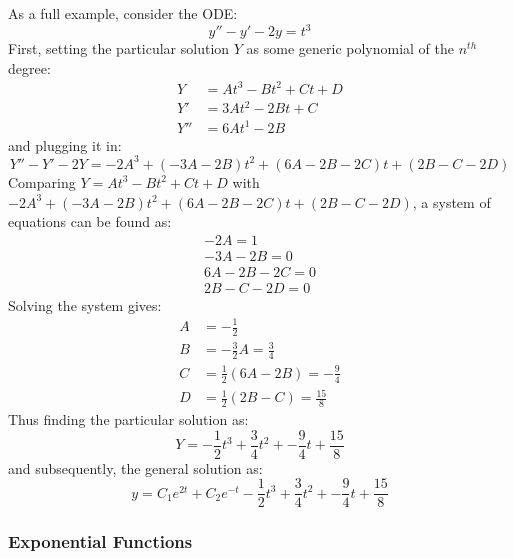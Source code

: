 \documentclass[12pt]{article}
\begin{document}
As a full example, consider the ODE:
\begin{equation*}
  y'' - y' - 2y = t^3
\end{equation*}
First, setting the particular solution $Y$ as some generic polynomial of the $n^{th}$ degree:
\begin{align*}
  Y &= At^3 - Bt^2 + Ct + D \\
  Y' &= 3At^2 - 2Bt + C \\
  Y'' &= 6At^1 - 2B
\end{align*}
and plugging it in:
\begin{equation*}
  Y'' - Y' - 2Y = -2A^3 + \left(-3A-2B\right)t^2 + (6A-2B-2C)t + (2B-C-2D)
\end{equation*}
Comparing $Y = At^3 - Bt^2 + Ct + D$ with $-2A^3 + \left(-3A-2B\right)t^2 + (6A-2B-2C)t + (2B-C-2D)$, a system of equations can be found as:
\begin{gather*}
  -2A = 1 \\
  -3A-2B = 0 \\
  6A - 2B - 2C = 0 \\
  2B - C - 2D = 0
\end{gather*}
Solving the system gives:
\begin{align*}
  A &= - \frac{1}{2} \\
  B &= - \frac{3}{2}A = \frac{3}{4} \\
  C &= \frac{1}{2}(6A-2B) = -\frac{9}{4} \\
  D &= \frac{1}{2}(2B-C) = \frac{15}{8}
\end{align*}
Thus finding the particular solution as:
\begin{equation*}
  Y = - \frac{1}{2}t^3 + \frac{3}{4}t^2 + -\frac{9}{4}t + \frac{15}{8}
\end{equation*}
and subsequently, the general solution as:
\begin{equation*}
  y = C_1e^{2t} + C_2e^{-t} - \frac{1}{2}t^3 + \frac{3}{4}t^2 + -\frac{9}{4}t + \frac{15}{8}
\end{equation*}

\subsubsection{Exponential Functions}
\label{sssec:exponentialFunctions}
\end{document}
